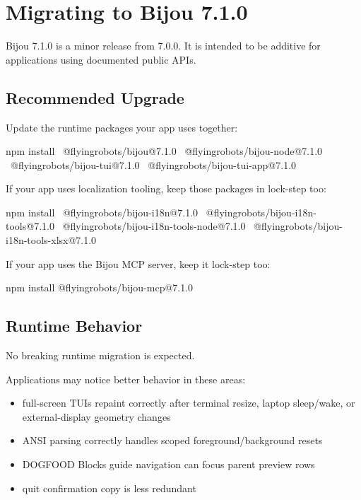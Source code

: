 \chapter{Migrating to Bijou 7.1.0}\label{record-271}

\smallskip

Bijou 7.1.0 is a minor release from 7.0.0. It is intended to be additive for applications using documented public APIs.

\section{Recommended Upgrade}\label{record-271-recommended-upgrade}

Update the runtime packages your app uses together:

\begin{CodeBlock}
npm install \
  @flyingrobots/bijou@7.1.0 \
  @flyingrobots/bijou-node@7.1.0 \
  @flyingrobots/bijou-tui@7.1.0 \
  @flyingrobots/bijou-tui-app@7.1.0
\end{CodeBlock}

If your app uses localization tooling, keep those packages in lock-step too:

\begin{CodeBlock}
npm install \
  @flyingrobots/bijou-i18n@7.1.0 \
  @flyingrobots/bijou-i18n-tools@7.1.0 \
  @flyingrobots/bijou-i18n-tools-node@7.1.0 \
  @flyingrobots/bijou-i18n-tools-xlsx@7.1.0
\end{CodeBlock}

If your app uses the Bijou MCP server, keep it lock-step too:

\begin{CodeBlock}
npm install @flyingrobots/bijou-mcp@7.1.0
\end{CodeBlock}

\section{Runtime Behavior}\label{record-271-runtime-behavior}

No breaking runtime migration is expected.

Applications may notice better behavior in these areas:

\begin{itemize}
\tightlist
\item
  full-screen TUIs repaint correctly after terminal resize, laptop sleep/wake, or external-display geometry changes
\item
  ANSI parsing correctly handles scoped foreground/background resets
\item
  DOGFOOD Blocks guide navigation can focus parent preview rows
\item
  quit confirmation copy is less redundant
\end{itemize}

